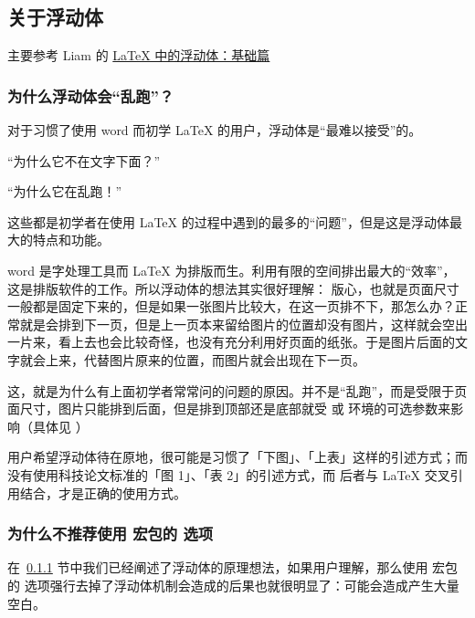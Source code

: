 
\subsection{关于浮动体}

主要参考 Liam 的 \href{https://liam.page/2017/03/11/floats-in-LaTeX-basic/}{LaTeX 中的浮动体：基础篇}

\subsubsection{为什么浮动体会“乱跑”？}\label{subsubsec:浮动体乱跑}

对于习惯了使用 word 而初学 \LaTeX{} 的用户，浮动体是“最难以接受”的。

\begin{latexexample}
  “为什么它不在文字下面？”

  “为什么它在乱跑！”
\end{latexexample}

这些都是初学者在使用 \LaTeX{} 的过程中遇到的最多的“问题”，但是这是浮动体最大的特点和功能。

word 是字处理工具而 \LaTeX{} 为排版而生。利用有限的空间排出最大的“效率”，这是排版软件的工作。所以浮动体的想法其实很好理解：
版心，也就是页面尺寸一般都是固定下来的，但是如果一张图片比较大，在这一页排不下，那怎么办？正常就是会排到下一页，但是上一页本来留给图片的位置却没有图片，这样就会空出一片来，看上去也会比较奇怪，也没有充分利用好页面的纸张。于是图片后面的文字就会上来，代替图片原来的位置，而图片就会出现在下一页。

这，就是为什么有上面初学者常常问的问题的原因。并不是“乱跑”，而是受限于页面尺寸，图片只能排到后面，但是排到顶部还是底部就受  或  环境的可选参数来影响（具体见 ）

用户希望浮动体待在原地，很可能是习惯了「下图」、「上表」这样的引述方式；而没有使用科技论文标准的「图 1」、「表 2」的引述方式，而 后者与 \LaTeX{} 交叉引用结合，才是正确的使用方式。


\subsubsection{为什么不推荐使用  宏包的  选项}\label{subsubsec:不推荐float}

在~\ref{subsubsec:浮动体乱跑} 节中我们已经阐述了浮动体的原理想法，如果用户理解，那么使用  宏包的  选项强行去掉了浮动体机制会造成的后果也就很明显了：可能会造成产生大量空白。


